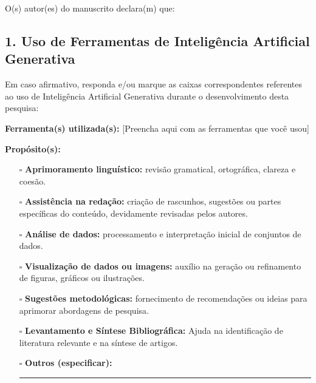 
\begin{spacing}{1.2} %
\normalsize %

O(s) autor(es) do manuscrito declara(m) que:

\subsection*{1. Uso de Ferramentas de Inteligência Artificial Generativa}

\noindent Em caso afirmativo, responda e/ou marque as caixas correspondentes referentes ao uso de Inteligência Artificial Generativa durante o desenvolvimento desta pesquisa:

\vspace{0.5cm}

\noindent\textbf{Ferramenta(s) utilizada(s):} [Preencha aqui com as ferramentas que você usou]

\vspace{0.5cm}

\noindent\textbf{Propósito(s):}
\begin{itemize}{\itemsep=0.2em} %
    \item[$\square$] \textbf{Aprimoramento linguístico:} revisão gramatical, ortográfica, clareza e coesão.
    \item[$\square$] \textbf{Assistência na redação:} criação de rascunhos, sugestões ou partes específicas do conteúdo, devidamente revisadas pelos autores.
    \item[$\square$] \textbf{Análise de dados:} processamento e interpretação inicial de conjuntos de dados.
    \item[$\square$] \textbf{Visualização de dados ou imagens:} auxílio na geração ou refinamento de figuras, gráficos ou ilustrações.
    \item[$\square$] \textbf{Sugestões metodológicas:} fornecimento de recomendações ou ideias para aprimorar abordagens de pesquisa.
    \item[$\square$] \textbf{Levantamento e Síntese Bibliográfica:} Ajuda na identificação de literatura relevante e na síntese de artigos.
    \item[$\square$] \textbf{Outros (especificar):} \rule{8cm}{0.4pt}
\end{itemize}


\end{spacing}
